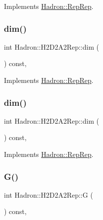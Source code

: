 Implements \mbox{\hyperlink{structHadron_1_1RepRep_a92c8802e5ed7afd7da43ccfd5b7cd92b}{Hadron\+::\+Rep\+Rep}}.

\mbox{\label{structHadron_1_1H2D2A2Rep_aca0f53f952eae12ac23f9cc429108dcc}} 
\subsubsection{\texorpdfstring{dim()}{dim()}\hspace{0.1cm}{\footnotesize\ttfamily [2/3]}}
{\footnotesize\ttfamily int Hadron\+::\+H2\+D2\+A2\+Rep\+::dim (\begin{DoxyParamCaption}{ }\end{DoxyParamCaption}) const\hspace{0.3cm}{\ttfamily [inline]}, {\ttfamily [virtual]}}



Implements \mbox{\hyperlink{structHadron_1_1RepRep_a92c8802e5ed7afd7da43ccfd5b7cd92b}{Hadron\+::\+Rep\+Rep}}.

\mbox{\label{structHadron_1_1H2D2A2Rep_aca0f53f952eae12ac23f9cc429108dcc}} 
\subsubsection{\texorpdfstring{dim()}{dim()}\hspace{0.1cm}{\footnotesize\ttfamily [3/3]}}
{\footnotesize\ttfamily int Hadron\+::\+H2\+D2\+A2\+Rep\+::dim (\begin{DoxyParamCaption}{ }\end{DoxyParamCaption}) const\hspace{0.3cm}{\ttfamily [inline]}, {\ttfamily [virtual]}}



Implements \mbox{\hyperlink{structHadron_1_1RepRep_a92c8802e5ed7afd7da43ccfd5b7cd92b}{Hadron\+::\+Rep\+Rep}}.

\mbox{\label{structHadron_1_1H2D2A2Rep_ac1b2b45b37d739d8310f21abba40eb84}} 
\subsubsection{\texorpdfstring{G()}{G()}\hspace{0.1cm}{\footnotesize\ttfamily [1/2]}}
{\footnotesize\ttfamily int Hadron\+::\+H2\+D2\+A2\+Rep\+::G (\begin{DoxyParamCaption}{ }\end{DoxyParamCaption}) const\hspace{0.3cm}{\ttfamily [inline]}, {\ttfamily [virtual]}}

